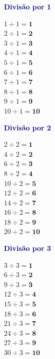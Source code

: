 \documentclass[12pt]{article}
\begin{document}
\vspace{4pt}


\vspace{6pt}\noindent
\begin{minipage}[t]{3.3cm}
\noindent\textcolor{darkblue}{\bfseries\small Divisão por 1}\par\vspace{2pt}
{\footnotesize
$1\div1=\mathbf{1}$\\$2\div1=\mathbf{2}$\\$3\div1=\mathbf{3}$\\
$4\div1=\mathbf{4}$\\$5\div1=\mathbf{5}$\\$6\div1=\mathbf{6}$\\
$7\div1=\mathbf{7}$\\$8\div1=\mathbf{8}$\\$9\div1=\mathbf{9}$\\
$10\div1=\mathbf{10}$}
\end{minipage}\hfill
\begin{minipage}[t]{3.3cm}
\noindent\textcolor{darkblue}{\bfseries\small Divisão por 2}\par\vspace{2pt}
{\footnotesize
$2\div2=\mathbf{1}$\\$4\div2=\mathbf{2}$\\$6\div2=\mathbf{3}$\\
$8\div2=\mathbf{4}$\\$10\div2=\mathbf{5}$\\$12\div2=\mathbf{6}$\\
$14\div2=\mathbf{7}$\\$16\div2=\mathbf{8}$\\$18\div2=\mathbf{9}$\\
$20\div2=\mathbf{10}$}
\end{minipage}\hfill
\begin{minipage}[t]{3.3cm}
\noindent\textcolor{darkblue}{\bfseries\small Divisão por 3}\par\vspace{2pt}
{\footnotesize
$3\div3=\mathbf{1}$\\$6\div3=\mathbf{2}$\\$9\div3=\mathbf{3}$\\
$12\div3=\mathbf{4}$\\$15\div3=\mathbf{5}$\\$18\div3=\mathbf{6}$\\
$21\div3=\mathbf{7}$\\$24\div3=\mathbf{8}$\\$27\div3=\mathbf{9}$\\
$30\div3=\mathbf{10}$}
\end{minipage}\hfill
\end{document}
